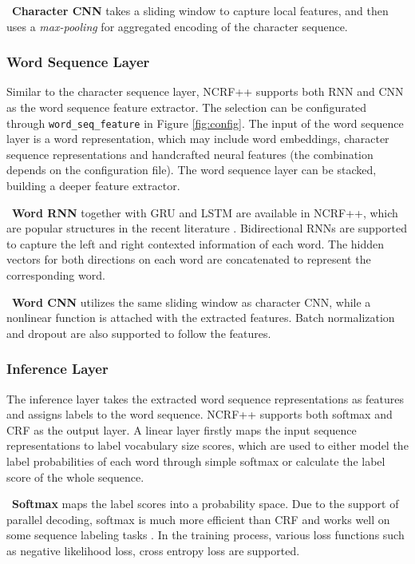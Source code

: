 \documentclass[11pt,a4paper]{article}
\begin{document}
\noindent \textbullet $\,$  \textbf{Character CNN} takes a sliding window to capture local features, and then uses a \textit{max-pooling} for aggregated encoding of the character sequence.

\subsubsection{Word Sequence Layer}
Similar to the character sequence layer, NCRF++ supports both RNN and CNN as the word sequence feature extractor. The selection can be configurated through \texttt{word\_seq\_feature} in Figure \ref{fig:config}. The input of the word sequence layer is a word representation, which may include word embeddings, character sequence representations and handcrafted neural features (the combination depends on the configuration file). The word sequence layer can be stacked, building a deeper feature extractor.


\noindent \textbullet $\,$ \textbf{Word RNN} together with GRU and LSTM are available in NCRF++, which are popular structures in the recent literature \cite{huang2015bidirectional,lample2016neural,ma2016end,yang2017transfer}. Bidirectional RNNs are supported to capture the left and right contexted information of each word. The hidden vectors for both directions on each word are concatenated to represent the corresponding word.

\noindent \textbullet $\,$  \textbf{Word CNN} utilizes the same sliding window as character CNN, while a nonlinear function \cite{glorot2011deep} is attached with the extracted features. Batch normalization \cite{ioffe2015batch} and dropout \cite{srivastava2014dropout} are also supported to follow the features.

\subsubsection{Inference Layer}
The inference layer takes the extracted word sequence representations as features and assigns labels to the word sequence. NCRF++ supports both softmax and CRF as the output layer. A linear layer firstly maps the input sequence representations to label vocabulary size scores, which are used to either model the label probabilities of each word through simple softmax or calculate the label score of the whole sequence.

\noindent \textbullet $\,$  \textbf{Softmax} maps the label scores into a probability space. Due to the support of parallel decoding, softmax is much more efficient than CRF and works well on some sequence labeling tasks \cite{ling2015finding}. In the training process, various loss functions such as negative likelihood loss, cross entropy loss are supported.
\end{document}
